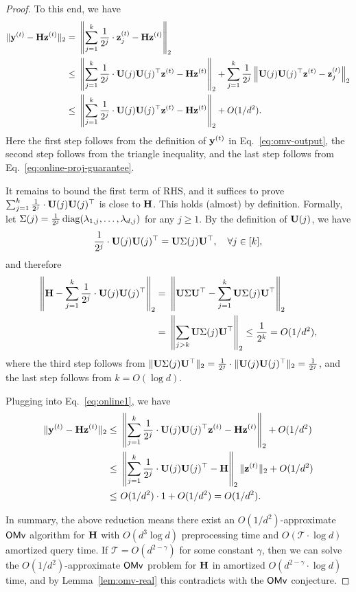 \begin{proof}
To this end, we have
\begin{align}
\|\mathbf{y}^{(t)} - \mathbf{H}\mathbf{z}^{(t)}\|_2 = &~ \left\|\sum_{j=1}^{k} \frac{1}{2^j} \cdot \mathbf{z}^{(t)}_j - \mathbf{H}\mathbf{z}^{(t)}\right\|_2 \notag \\
\leq &~  \left\|\sum_{j=1}^{k} \frac{1}{2^j} \cdot \mathbf{U}(j)\mathbf{U}(j)^{\top}\mathbf{z}^{(t)} - \mathbf{H}\mathbf{z}^{(t)}\right\|_2 + \sum_{j=1}^{k}\frac{1}{2^j}\left\|\mathbf{U}(j)\mathbf{U}(j)^{\top}\mathbf{z}^{(t)} - \mathbf{z}_j^{(t)}\right\|_2 \notag \\
\leq &~ \left\|\sum_{j=1}^{k} \frac{1}{2^j} \cdot \mathbf{U}(j)\mathbf{U}(j)^{\top} \mathbf{z}^{(t)} - \mathbf{H}\mathbf{z}^{(t)}\right\|_2 + O(1/d^2).\label{eq:online1}
\end{align}
Here the first step follows from the definition of $\mathbf{y}^{(t)}$ in Eq.~\eqref{eq:omv-output}, the second step follows from the triangle inequality, and the last step follows from Eq.~\eqref{eq:online-proj-guarantee}.

It remains to bound the first term of RHS, and it suffices to prove $\sum_{j=1}^{k} \frac{1}{2^j} \cdot \mathbf{U}(j)\mathbf{U}(j)^{\top}$ is close to $\mathbf{H}$. 
This holds (almost) by definition. 
Formally, let $\Sigma(j) = \frac{1}{2^j}\operatorname{diag}(\lambda_{1,j}, \ldots, \lambda_{d, j})$ for any $j \geq 1$. By the definition of $\mathbf{U}(j)$, we have
\begin{align*}
\frac{1}{2^j} \cdot \mathbf{U}(j)\mathbf{U}(j)^{\top} =\mathbf{U}\Sigma(j)\mathbf{U}^{\top}, \quad \forall j \in [k],
\end{align*}
and therefore 
\begin{align*}
\left\|\mathbf{H} - \sum_{j=1}^{k}\frac{1}{2^j} \cdot \mathbf{U}(j)\mathbf{U}(j)^{\top}\right\|_2 = &~ \left\| \mathbf{U} \Sigma \mathbf{U}^{\top} - \sum_{j=1}^{k}\mathbf{U}\Sigma(j)\mathbf{U}^{\top}\right\|_2 \\
= &~ \left\|\sum_{j> k} \mathbf{U}\Sigma(j)\mathbf{U}^{\top}\right\|_2 \leq \frac{1}{2^{k}} = O(1/d^2),
\end{align*}
where the third step follows from $\| \mathbf{U}\Sigma(j)\mathbf{U}^{\top} \|_2 = \frac{1}{2^j} \cdot \|\mathbf{U}(j) \mathbf{U}(j)^{\top}\|_2 = \frac{1}{2^j}$, and the last step follows from $k = O(\log d)$.

Plugging into Eq.~\eqref{eq:online1}, we have 
\begin{align*}
\|\mathbf{y}^{(t)} - \mathbf{H}\mathbf{z}^{(t)}\|_2 \leq &~\left\|\sum_{j=1}^{k} \frac{1}{2^j} \cdot \mathbf{U}(j)\mathbf{U}(j)^{\top}\mathbf{z}^{(t)} - \mathbf{H}\mathbf{z}^{(t)}\right\|_2 + O(1/d^2)\\
\leq &~ \left\|\sum_{j=1}^{k} \frac{1}{2^j} \cdot \mathbf{U}(j)\mathbf{U}(j)^{\top} - \mathbf{H}\right\|_2 \|\mathbf{z}^{(t)}\|_2  + O(1/d^2)\\
\leq &~ O(1/d^2)\cdot 1 + O(1/d^2) = O(1/d^2).
\end{align*}


In summary, the above reduction means there exist an $O(1/d^2)$-approximate $\mathsf{OMv}$ algorithm for $\mathbf{H}$ with $O(d^3 \log d)$ preprocessing time and $O(\mathcal{T} \cdot \log d)$ amortized query time. If $\mathcal{T} = O(d^{2-\gamma})$ for some constant $\gamma$, then we can solve the $O(1/d^2)$-approximate $\mathsf{OMv}$ problem for $\mathbf{H}$ in amortized $O(d^{2-\gamma} \cdot \log d)$ time, and by Lemma~\ref{lem:omv-real} this contradicts with the $\mathsf{OMv}$ conjecture.
\end{proof}







